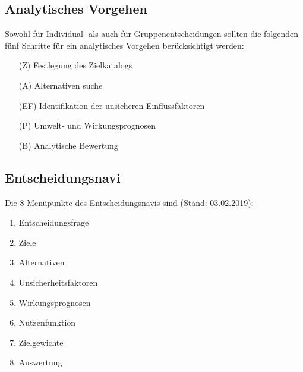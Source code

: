 \documentclass[12pt,a4paper]{scrartcl}
\begin{document}
\subsection{Analytisches Vorgehen \cite{vonNitzsch:211553}}
Sowohl für Individual- als auch für Gruppenentscheidungen sollten die folgenden fünf Schritte für ein analytisches Vorgehen berücksichtigt werden:
\begin{enumerate}
	\item[(Z)] Festlegung des Zielkatalogs
	\item[(A)] Alternativen suche
	\item[(EF)] Identifikation der unsicheren Einflussfaktoren
	\item[(P)] Umwelt- und Wirkungsprognosen
	\item[(B)] Analytische Bewertung
\end{enumerate}

\subsection{Entscheidungsnavi}
Die 8 Menüpunkte des Entscheidungsnavis sind (Stand: 03.02.2019):
\begin{enumerate}
	\item Entscheidungsfrage
	\item Ziele
	\item Alternativen
	\item Unsicherheitsfaktoren
	\item Wirkungsprognosen
	\item Nutzenfunktion
	\item Zielgewichte
	\item Auswertung
	
\end{enumerate}
\end{document}
